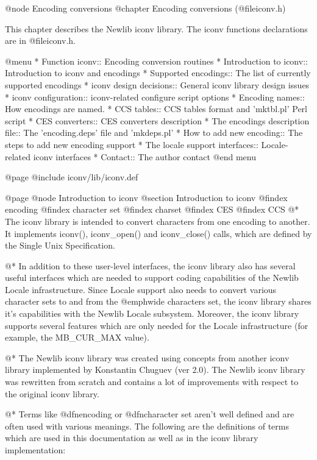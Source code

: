 @node Encoding conversions
@chapter Encoding conversions (@file{iconv.h})

This chapter describes the Newlib iconv library.
The iconv functions declarations are in
@file{iconv.h}.

@menu
* Function iconv::                  Encoding conversion routines
* Introduction to iconv::           Introduction to iconv and encodings
* Supported encodings::             The list of currently supported encodings
* iconv design decisions::          General iconv library design issues
* iconv configuration::             iconv-related configure script options
* Encoding names::                  How encodings are named.
* CCS tables::                      CCS tables format and 'mktbl.pl' Perl script
* CES converters::                  CES converters description
* The encodings description file::  The 'encoding.deps' file and 'mkdeps.pl'
* How to add new encoding::         The steps to add new encoding support
* The locale support interfaces::   Locale-related iconv interfaces
* Contact::                         The author contact
@end menu

@page
@include iconv/lib/iconv.def

@page
@node Introduction to iconv
@section Introduction to iconv
@findex encoding
@findex character set
@findex charset
@findex CES
@findex CCS
@*
The iconv library is intended to convert characters from one encoding to
another. It implements iconv(), iconv_open() and iconv_close()
calls, which are defined by the Single Unix Specification.

@*
In addition to these user-level interfaces, the iconv library also has
several useful interfaces which are needed to support coding
capabilities of the Newlib Locale infrastructure.  Since Locale 
support also needs to
convert various character sets to and from the @emph{wide characters
set}, the iconv library shares it's capabilities with the Newlib Locale
subsystem. Moreover, the iconv library supports several features which are
only needed for the Locale infrastructure (for example, the MB_CUR_MAX value).

@*
The Newlib iconv library was created using concepts from another iconv
library implemented by Konstantin Chuguev (ver 2.0). The Newlib iconv library
was rewritten from scratch and contains a lot of improvements with respect to
the original iconv library. 

@*
Terms like @dfn{encoding} or @dfn{character set} aren't well defined and
are often used with various meanings. The following are the definitions of terms
which are used in this documentation as well as in the iconv library
implementation:

